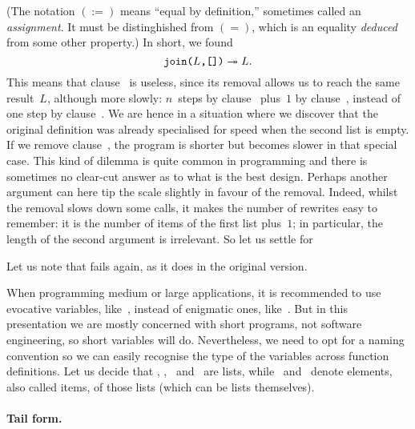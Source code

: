 (The notation \((:=)\) means ``equal by definition,''
sometimes called an \emph{assignment}. It must be distinghished from
\((=)\), which is an equality \emph{deduced} from some other property.)
In short, we found
\[
\texttt{join(\(L\),[])} \twoheadrightarrow L.
\]
This means that clause~\clause{\beta} is useless, since its removal
allows us to reach the same result~\(L\), although more slowly:
\(n\)~steps by clause~\clause{\gamma} plus~\(1\) by
clause~\clause{\alpha}, instead of one step by
clause~\clause{\beta}. We are hence in a situation where we discover
that the original definition was already specialised for speed when
the second list is empty. If we remove clause~\clause{\beta}, the
program is shorter but becomes slower in that special case. This kind
of dilemma is quite common in programming and there is sometimes no
clear\hyp{}cut answer as to what is the best design. Perhaps another
argument can here tip the scale slightly in favour of the
removal. Indeed, whilst the removal slows down some calls, it makes
the number of rewrites easy to remember: it is the number of items of
the first list plus~\(1\); in particular, the length of the second
argument is irrelevant. So let us settle for\label{code:join}



\noindent Let us note that  fails again, as it
does in the original version.

When programming medium or large applications, it is recommended to
use evocative variables, like~, instead of
enigmatic ones, like~. But in this presentation we are
mostly concerned with short programs, not software engineering, so
short variables will do. Nevertheless, we need to opt for a naming
convention so we can easily recognise the type of the variables across
function definitions. Let us decide that , ,
~and~ are lists, while
~and~ denote elements, also called items, of
those lists (which can be lists themselves).

\medskip

\paragraph{Tail form.}

